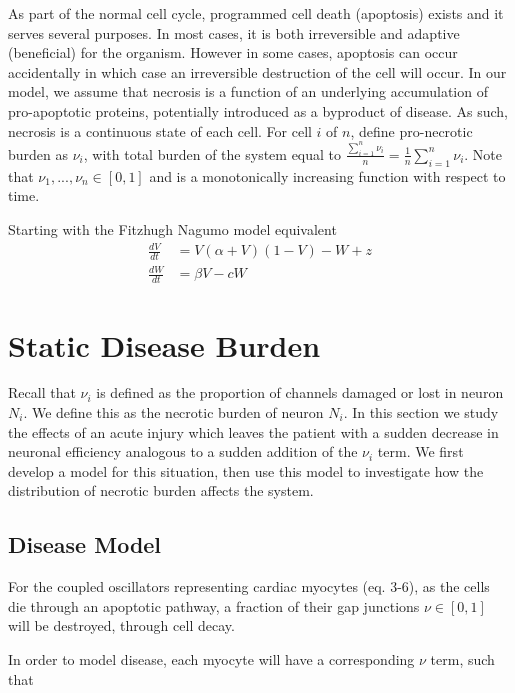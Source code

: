\documentclass[11pt]{report}
\begin{document}
As part of the normal cell cycle, programmed cell death (apoptosis) exists and it serves several purposes. In most cases, it is both irreversible and adaptive (beneficial) for the organism. However in some cases, apoptosis can occur accidentally in which case an irreversible destruction of the cell will occur. In our model, we assume that necrosis is a function of an underlying accumulation of pro-apoptotic proteins, potentially introduced as a byproduct of disease. As such, necrosis is a continuous state of each cell. For cell $i$ of $n$, define pro-necrotic burden as $\nu_i$, with total burden of the system equal to $\frac{\sum^n_{i=1} \nu_i}{n}=\frac{1}{n} \sum^n_{i=1} \nu_i$. Note that $\nu_{1}, ..., \nu_{n} \in [0,1]$ and is a monotonically increasing function with respect to time. 

Starting with the Fitzhugh Nagumo model equivalent
\begin{align}
\frac{dV}{dt} &= V(\alpha +V)(1-V) -W +z\\
\frac{dW}{dt} &= \beta V - cW
\end{align}



\section{Static Disease Burden} %
\label{sub:static_disease_burden}

Recall that $\nu_i$ is defined as the proportion of channels damaged or lost in neuron $N_i$. We define this as the necrotic burden of neuron $N_i$. In this section we study the effects of an acute injury which leaves the patient with a sudden decrease in neuronal efficiency analogous to a sudden addition of the $\nu_i$ term. We first develop a model for this situation, then use this model to investigate how the distribution of necrotic burden affects the system.

\subsection{Disease Model} %
\label{sub:disease_model}


For the coupled oscillators representing cardiac myocytes (eq. 3-6), as the cells die through an apoptotic pathway, a fraction of their gap junctions $\nu \in [0,1]$ will be destroyed, through cell decay.

In order to model disease, each myocyte will have a corresponding $\nu$ term, such that
\end{document}
